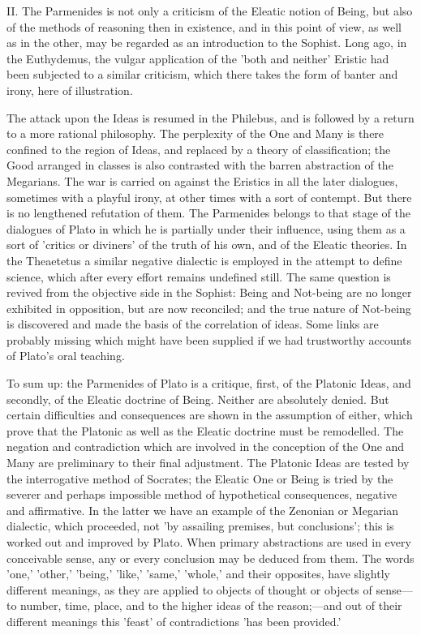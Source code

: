 \documentclass[11pt,letter]{article}
\begin{document}
\par  II. The Parmenides is not only a criticism of the Eleatic notion of Being, but also of the methods of reasoning then in existence, and in this point of view, as well as in the other, may be regarded as an introduction to the Sophist. Long ago, in the Euthydemus, the vulgar application of the 'both and neither' Eristic had been subjected to a similar criticism, which there takes the form of banter and irony, here of illustration.

\par  The attack upon the Ideas is resumed in the Philebus, and is followed by a return to a more rational philosophy. The perplexity of the One and Many is there confined to the region of Ideas, and replaced by a theory of classification; the Good arranged in classes is also contrasted with the barren abstraction of the Megarians. The war is carried on against the Eristics in all the later dialogues, sometimes with a playful irony, at other times with a sort of contempt. But there is no lengthened refutation of them. The Parmenides belongs to that stage of the dialogues of Plato in which he is partially under their influence, using them as a sort of 'critics or diviners' of the truth of his own, and of the Eleatic theories. In the Theaetetus a similar negative dialectic is employed in the attempt to define science, which after every effort remains undefined still. The same question is revived from the objective side in the Sophist: Being and Not-being are no longer exhibited in opposition, but are now reconciled; and the true nature of Not-being is discovered and made the basis of the correlation of ideas. Some links are probably missing which might have been supplied if we had trustworthy accounts of Plato's oral teaching.

\par  To sum up: the Parmenides of Plato is a critique, first, of the Platonic Ideas, and secondly, of the Eleatic doctrine of Being. Neither are absolutely denied. But certain difficulties and consequences are shown in the assumption of either, which prove that the Platonic as well as the Eleatic doctrine must be remodelled. The negation and contradiction which are involved in the conception of the One and Many are preliminary to their final adjustment. The Platonic Ideas are tested by the interrogative method of Socrates; the Eleatic One or Being is tried by the severer and perhaps impossible method of hypothetical consequences, negative and affirmative. In the latter we have an example of the Zenonian or Megarian dialectic, which proceeded, not 'by assailing premises, but conclusions'; this is worked out and improved by Plato. When primary abstractions are used in every conceivable sense, any or every conclusion may be deduced from them. The words 'one,' 'other,' 'being,' 'like,' 'same,' 'whole,' and their opposites, have slightly different meanings, as they are applied to objects of thought or objects of sense—to number, time, place, and to the higher ideas of the reason;—and out of their different meanings this 'feast' of contradictions 'has been provided.'
\end{document}
